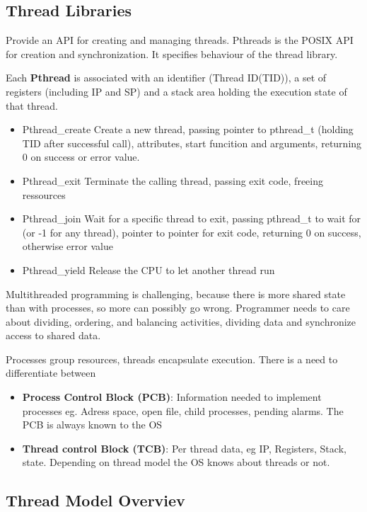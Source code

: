 \documentclass[11pt,a4paper]{article}
\begin{document}
	\subsection{Thread Libraries}
	Provide an API for creating and managing threads. Pthreads is the POSIX API for creation and synchronization. It specifies behaviour of the thread library.
	
	Each \textbf{Pthread} is associated with an identifier (Thread ID(TID)), a set of registers (including IP and SP) and a stack area holding the execution state of that thread.
	
	\begin{itemize}
		\item Pthread\_create Create a new thread, passing pointer to pthread\_t (holding TID after successful call), attributes, start funcition and arguments, returning 0 on success or error value.
		\item Pthread\_exit Terminate the calling thread, passing exit code, freeing ressources
		\item Pthread\_join Wait for a specific thread to exit, passing pthread\_t to wait for (or -1 for any thread), pointer to pointer for exit code, returning 0 on success, otherwise error value
		\item Pthread\_yield Release the CPU to let another thread run
	\end{itemize}

	Multithreaded programming is challenging, because there is more shared state than with processes, so more can possibly go wrong. Programmer needs to care about dividing, ordering, and balancing activities, dividing data and synchronize access to shared data.
	
	Processes group resources, threads encapsulate execution. There is a need to differentiate between
	\begin{itemize}
		\item \textbf{Process Control Block (PCB)}: Information needed to implement processes eg. Adress space, open file, child processes, pending alarms. \newline
		The PCB is always known to the OS
		\item \textbf{Thread control Block (TCB)}: Per thread data, eg IP, Registers, Stack, state. Depending on thread model the OS knows about threads or not.
 	\end{itemize}
 
	\subsection{Thread Model Overviev}
	
\end{document}
